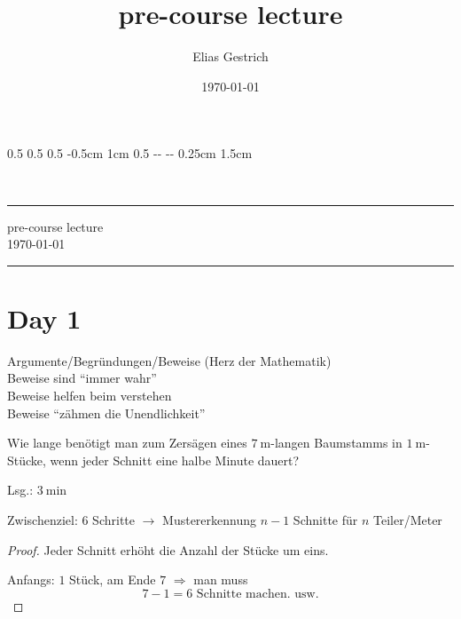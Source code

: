 \documentclass[a4paper, parskip = true, fleqn, headsepline = true]{scrartcl}
\title{pre-course lecture}
\author{Elias Gestrich}
\date{\today}
\newlength{\hmargin}
\newlength{\lmargin}
\newlength{\rmargin}
\newlength{\fmargin}
\begin{document}
\setlength{\hoffset}		{0.5\lmargin-1in}
\setlength{\voffset}		{0.5\hmargin-1in}
\setlength{\oddsidemargin}	{0.5\lmargin}
\setlength{\topmargin}		{-0.5cm}
\setlength{\headheight}		{1cm}
\setlength{\headsep}		{0.5\hmargin-0.5cm}
%
\setlength{\textheight}		{\paperheight-\hmargin-\fmargin}
\setlength{\textwidth}		{\paperwidth-\lmargin-\rmargin}
\setlength{\linewidth}		{\textwidth}
%
\setlength{\marginparsep}	{0.25cm}
\setlength{\marginparwidth}	{1.5cm}

\thispagestyle{empty}
~\\[1cm]
\begin{center}
	\hspace{0.1\textwidth}\rule{0.8\textwidth}{0.5pt}\vspace{4pt}
	\Large pre-course lecture\\[5pt]
	\large \today\\
	\hspace{0.1\textwidth}\rule{0.8\textwidth}{0.5pt}\vspace{4pt}
\end{center}




\section{Day 1}
Argumente/Begründungen/Beweise (Herz der Mathematik)\\
Beweise sind ``immer wahr''\\
Beweise helfen beim verstehen\\
Beweise ``zähmen die Unendlichkeit''\par

\begin{problem}
	Wie lange benötigt man zum Zersägen eines $\qty{7}{\meter}$-langen Baumstamms in $\qty{1}{\meter}$-Stücke, wenn jeder Schnitt eine halbe Minute dauert?\par
	Lsg.: $\qty{3}{\minute}$\par
	Zwischenziel: 6 Schritte $\rightarrow$ Mustererkennung $n-1$ Schnitte für $n$ Teiler/Meter\par
	\begin{proof}
		Jeder Schnitt erhöht die Anzahl der Stücke um eins.\par
		Anfangs: $1$ Stück, am Ende $7$ $\Rightarrow$ man muss \[7 - 1 = 6 \text{ Schnitte machen. usw.}\]
	\end{proof}
\end{problem}
\end{document}
